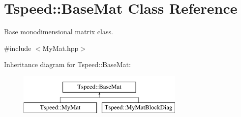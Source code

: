 \hypertarget{classTspeed_1_1BaseMat}{\section{Tspeed\-:\-:Base\-Mat Class Reference}
\label{classTspeed_1_1BaseMat}
}


Base monodimensional matrix class.  




{\ttfamily \#include $<$My\-Mat.\-hpp$>$}

Inheritance diagram for Tspeed\-:\-:Base\-Mat\-:\begin{figure}[H]
\begin{center}
\leavevmode
\includegraphics[height=2.000000cm]{classTspeed_1_1BaseMat}
\end{center}
\end{figure}
